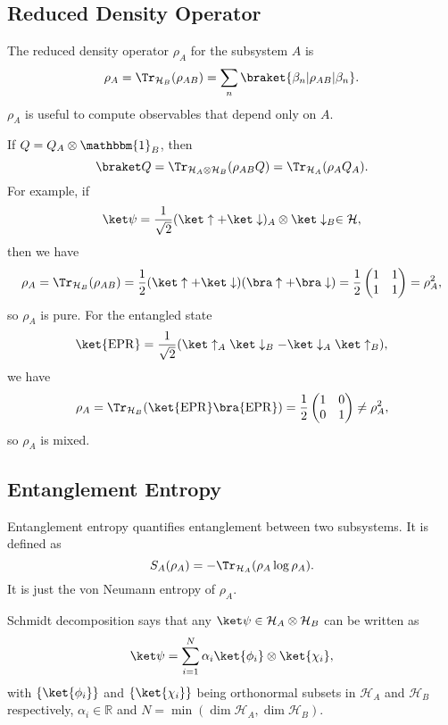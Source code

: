 \documentclass[12pt]{article}
\begin{document}
\subsection{Reduced Density Operator}
\label{sub:reduced_density}

The reduced density operator $\rho_A$ for the subsystem $A$ is
\[
	\rho_A = \Tr_{\mathcal{H}_B}(\rho_{AB}) = \sum_n \braket{\beta_n | \rho_{AB} | \beta_n}.
\]
$\rho_A$ is useful to compute observables that depend only on $A$.

\begin{exbox}
	If $Q = Q_A \otimes \mathbbm{1}_{B}$, then
	\[
		\braket Q = \Tr_{\mathcal{H}_A \otimes \mathcal{H}_B} (\rho_{AB} Q) = \Tr_{\mathcal{H}_A} (\rho_A Q_A).
	\]
	For example, if
	\[
	\ket \psi = \frac{1}{\sqrt 2}( \ket \uparrow + \ket \downarrow)_A \otimes \ket \downarrow_B \in \mathcal{H},
	\]
	then we have
	\[
	\rho_A = \Tr_{\mathcal{H}_B}(\rho_{AB}) = \frac{1}{2} (\ket \uparrow + \ket \downarrow)(\bra \uparrow + \bra \downarrow) = \frac{1}{2}
	\begin{pmatrix}
		1 & 1 \\ 1 & 1
	\end{pmatrix}
	= \rho_A^2,
	\]
	so $\rho_A$ is pure. For the entangled state
	\[
		\ket{\mathrm{EPR}} = \frac{1}{\sqrt 2}(\ket\uparrow_A \ket\downarrow_B - \ket\downarrow_A\ket\uparrow_B),
	\]
	we have
	\[
		\rho_A = \Tr_{\mathcal{H}_B}(\ket{\mathrm{EPR}} \bra{\mathrm{EPR}}) = \frac{1}{2}
		\begin{pmatrix}
			1 & 0 \\ 0 & 1
		\end{pmatrix}
		\neq \rho_A^2,
	\]
	so $\rho_A$ is mixed.
\end{exbox}

\subsection{Entanglement Entropy}
\label{sub:ent_entropy}

Entanglement entropy quantifies entanglement between two subsystems. It is defined as
\[
S_A(\rho_A) = - \Tr_{\mathcal{H}_A}(\rho_A \log \rho_A).
\]
It is just the von Neumann entropy of $\rho_A$.

Schmidt decomposition says that any $\ket \psi \in \mathcal{H}_A \otimes \mathcal{H}_B$ can be written as
\[
	\ket \psi = \sum_{i = 1}^{N} \alpha_i \ket{\phi_i} \otimes \ket{\chi_i},
\]
with $\{\ket{\phi_i}\}$ and $\{\ket{\chi_i}\}$ being orthonormal subsets in $\mathcal{H}_A$ and $\mathcal{H}_B$ respectively, $\alpha_i \in \mathbb{R}$ and $N = \min(\dim \mathcal{H}_A, \dim \mathcal{H}_B)$.
\end{document}
